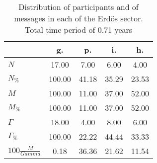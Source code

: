\begin{table}[h!]
\begin{center}
\begin{tabular}{| l | c | c | c | c |}\hline
 & g. & p. & i. & h. \\\hline
$N$ & 17.00  & 7.00  & 6.00  & 4.00 \\\hline
$N_{\%}$ & 100.00  & 41.18  & 35.29  & 23.53 \\\hline
$M$ & 100.00  & 11.00  & 37.00  & 52.00 \\\hline
$M_{\%}$ & 100.00  & 11.00  & 37.00  & 52.00 \\\hline
$\Gamma$ & 18.00  & 4.00  & 8.00  & 6.00 \\\hline
$\Gamma_{\%}$ & 100.00  & 22.22  & 44.44  & 33.33 \\\hline
$100\frac{M}{Gamma}$ & 0.18  & 36.36  & 21.62  & 11.54 \\\hline
\end{tabular}
\caption{Distribution of participants and of messages in each of the Erd\"os sector. Total time period of 0.71 years}
\end{center}
\end{table}